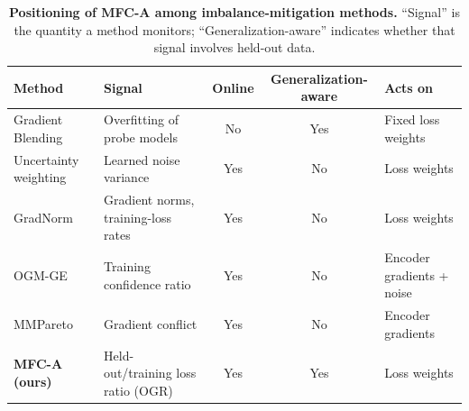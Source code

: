 \documentclass[fleqn,10pt]{wlscirep}
\providecommand{\DIFaddbegin}{} %
\providecommand{\DIFaddend}{} %
\providecommand{\DIFdelbegin}{} %
\providecommand{\DIFdelend}{} %
\begin{document}
\DIFdelbegin %
\DIFdelend \DIFaddbegin \begin{table}[t]
\caption{\textbf{Positioning of MFC-A among imbalance-mitigation methods.} ``Signal'' is the quantity a method monitors; ``Generalization-aware'' indicates whether that signal involves held-out data.}
\label{tab:relwork}
\centering
\small
\begin{tabularx}{\linewidth}{@{}lXccl@{}}
\toprule
\textbf{Method} & \textbf{Signal} & \textbf{Online} & \textbf{Generalization-aware} & \textbf{Acts on} \\ \midrule
Gradient Blending\cite{wang2020makes} & Overfitting of probe models & No & Yes & Fixed loss weights \\
Uncertainty weighting\cite{kendall2018multi} & Learned noise variance & Yes & No & Loss weights \\
GradNorm\cite{chen2018gradnorm} & Gradient norms, training-loss rates & Yes & No & Loss weights \\
OGM-GE\cite{peng2022balanced} & Training confidence ratio & Yes & No & Encoder gradients + noise \\
MMPareto\cite{wei2024mmpareto} & Gradient conflict & Yes & No & Encoder gradients \\
\textbf{MFC-A (ours)} & Held-out/training loss ratio (OGR) & Yes & Yes & Loss weights \\ \bottomrule
\end{tabularx}
\end{table}
\DIFaddend 
\end{document}
